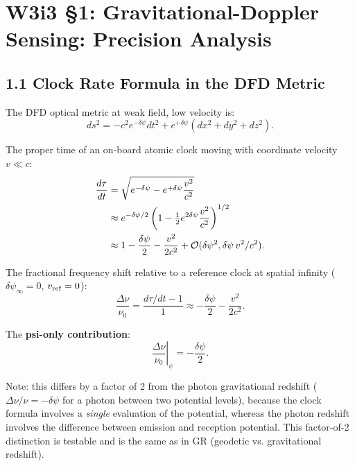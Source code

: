 \documentclass[11pt,twocolumn]{article}
\newcommand{\dpsi}{\delta\psi}
\newcommand{\order}[1]{\mathcal{O}(#1)}
\newcommand{\half}{\tfrac{1}{2}}
\begin{document}
\section*{W3i3 \S1: Gravitational-Doppler Sensing: Precision Analysis}
\label{sec:grav_doppler}

\subsection*{1.1 Clock Rate Formula in the DFD Metric}

The DFD optical metric at weak field, low velocity is:
\begin{equation}
ds^2 = -c^2 e^{-\dpsi}dt^2 + e^{+\dpsi}(dx^2+dy^2+dz^2).
\label{eq:metric}
\end{equation}

The proper time of an on-board atomic clock moving with coordinate velocity
$v \ll c$:
\begin{align}
\frac{d\tau}{dt} &= \sqrt{e^{-\dpsi} - e^{+\dpsi}\frac{v^2}{c^2}} \notag\\
&\approx e^{-\dpsi/2}\left(1 - \half e^{2\dpsi}\frac{v^2}{c^2}\right)^{1/2} \notag\\
&\approx 1 - \frac{\dpsi}{2} - \frac{v^2}{2c^2}
  + \order{\dpsi^2, \dpsi\, v^2/c^2}.
\label{eq:clock_rate}
\end{align}

The fractional frequency shift relative to a reference clock at spatial
infinity ($\dpsi_\infty = 0$, $v_{\rm ref} = 0$):
\begin{equation}
\frac{\Delta\nu}{\nu_0} = \frac{d\tau/dt - 1}{1}
\approx -\frac{\dpsi}{2} - \frac{v^2}{2c^2}.
\label{eq:freq_shift}
\end{equation}

The \textbf{psi-only contribution}:
\begin{equation}
\left.\frac{\Delta\nu}{\nu_0}\right|_\psi = -\frac{\dpsi}{2}.
\label{eq:psi_clock}
\end{equation}

Note: this differs by a factor of 2 from the photon gravitational redshift
($\Delta\nu/\nu = -\dpsi$ for a photon between two potential levels),
because the clock formula involves a \emph{single} evaluation of the potential,
whereas the photon redshift involves the difference between emission and
reception potential. This factor-of-2 distinction is testable and is
the same as in GR (geodetic vs. gravitational redshift).
\end{document}
